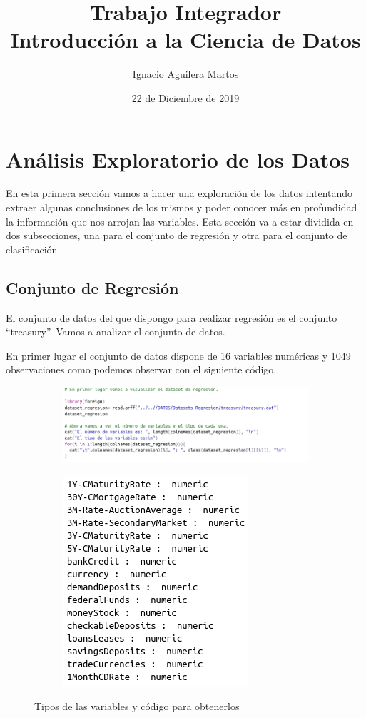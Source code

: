 \documentclass[12pt,a4paper]{article}
\author{Ignacio Aguilera Martos}
\title{Trabajo Integrador \\ Introducción a la Ciencia de Datos}
\date{22 de Diciembre de 2019}
\begin{document}
	\maketitle

	\tableofcontents

	\newpage
	
\section{Análisis Exploratorio de los Datos}

En esta primera sección vamos a hacer una exploración de los datos intentando extraer algunas conclusiones de los mismos y poder conocer más en profundidad la información que nos arrojan las variables. Esta sección va a estar dividida en dos subsecciones, una para el conjunto de regresión y otra para el conjunto de clasificación.

\subsection{Conjunto de Regresión}

El conjunto de datos del que dispongo para realizar regresión es el conjunto ``treasury''. Vamos a analizar el conjunto de datos.

En primer lugar el conjunto de datos dispone de  16 variables numéricas y 1049 observaciones como podemos observar con el siguiente código.

\begin{figure}[H]
	\centering
	\begin{subfigure}{0.47\textwidth}
		\includegraphics[scale=0.35]{./Imagenes/EDA/Regresion/codigo_variables_tipos.png}
	\end{subfigure}
	\begin{subfigure}{0.47\textwidth}
		\includegraphics[scale=0.4]{./Imagenes/EDA/Regresion/variables_tipos.png}
	\end{subfigure}
	\caption{Tipos de las variables y código para obtenerlos}
\end{figure}
\end{document}
